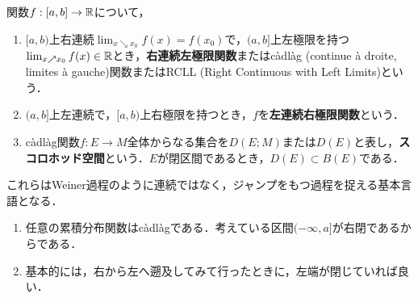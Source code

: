 \documentclass[uplatex,dvipdfmx]{jsreport}
\begin{document}
\begin{definition}
    関数$f:[a,b]\to\mathbb{R}$について，
    \begin{enumerate}
        \item $[a,b)$上右連続$\lim_{x\searrow x_0}f(x)=f(x_0)$で，$(a,b]$上左極限を持つ$\lim_{x\nearrow x_0}f(x)\in\mathbb{R}$とき，\textbf{右連続左極限関数}またはcàdlàg (continue à droite, limites à gauche)関数またはRCLL (Right Continuous with Left Limits)という．
        \item $(a,b]$上左連続で，$[a,b)$上右極限を持つとき，$f$を\textbf{左連続右極限関数}という．
        \item càdlàg関数$f:E\to M$全体からなる集合を$D(E;M)$または$D(E)$と表し，\textbf{スコロホッド空間}という．$E$が閉区間であるとき，$D(E)\subset B(E)$である．
    \end{enumerate}
    これらはWeiner過程のように連続ではなく，ジャンプをもつ過程を捉える基本言語となる．
\end{definition}
\begin{example}\mbox{}
    \begin{enumerate}
        \item 任意の累積分布関数はcàdlàgである．考えている区間$(-\infty,a]$が右閉であるからである．
        \item 基本的には，右から左へ遡及してみて行ったときに，左端が閉じていれば良い．
    \end{enumerate}
\end{example}
\end{document}
